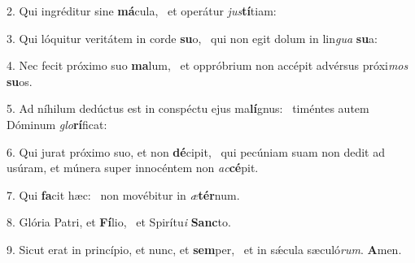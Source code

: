 2. Qui ingréditur sine \textbf{má}cula, \ast\  et operátur \textit{jus}\textbf{tí}tiam:\

3. Qui lóquitur veritátem in corde \textbf{su}o, \ast\  qui non egit dolum in lin\textit{gua} \textbf{su}a:\

4. Nec fecit próximo suo \textbf{ma}lum, \ast\  et oppróbrium non accépit advérsus próxi\textit{mos} \textbf{su}os.\

5. Ad níhilum dedúctus est in conspéctu ejus ma\textbf{lí}gnus: \ast\  timéntes autem Dóminum \textit{glo}\textbf{rí}ficat:\

6. Qui jurat próximo suo, et non \textbf{dé}cipit, \ast\  qui pecúniam suam non dedit ad usúram, et múnera super innocéntem non \textit{ac}\textbf{cé}pit.\

7. Qui \textbf{fa}cit hæc: \ast\  non movébitur in \textit{æ}\textbf{tér}num.\

8. Glória Patri, et \textbf{Fí}lio, \ast\  et Spirítu\textit{i} \textbf{Sanc}to.\

9. Sicut erat in princípio, et nunc, et \textbf{sem}per, \ast\  et in sǽcula sæculó\textit{rum}. \textbf{A}men.\

